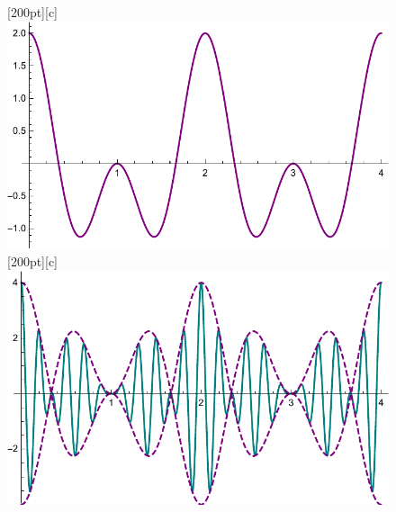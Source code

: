     \begin{figure}[H]
        \centering
        [200pt][c]{\includegraphics[scale=0.5]{body/image/chap4SSBa.pdf}}
        [200pt][c]{\includegraphics[scale=0.5]{body/image/chap4SSBb.pdf}}


\end{figure}
